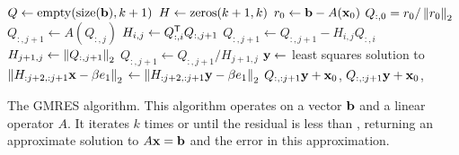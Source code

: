 \begin{algorithm}[H]
\begin{algorithmic}[1]
	\State $Q \gets \allocate{\size{\b}}{k+1}$			
	\State $H \gets \zeros{k+1}{ k}$
	\State $r_0 \gets \mathbf{b} - A(\mathbf{x}_0)$
	\State $Q_{:,0} = r_0/\left\lVert r_0\right\rVert_2$
    							
        \State $Q_{:,j+1} \gets A(Q_{:,j})$
            \State $H_{i,j} \gets Q_{:,i}^{\mathsf T} Q_{:,j+1}$
            \State $Q_{:,j+1} \gets Q_{:,j+1} - H_{i,j} Q_{:,i}$
        \EndFor
        \State $H_{j+1,j} \gets \left\lVert Q_{:,j+1}\right\rVert_2$
                                   
            \State $Q_{:,j+1} \gets Q_{:,j+1}/H_{j+1,j}$
        \EndIf
        \State $\mathbf{y} \gets$ least squares solution to $\left\lVert H_{:j+2,:j+1}\mathbf{x} - \beta e_1\right\rVert_2$     
        \State {} $\gets \left\lVert H_{:j+2,:j+1}\mathbf{y} - \beta e_1\right\rVert_2$
            \State {} $Q_{:,:j+1}\mathbf{y} + \mathbf{x}_0$, 
        \EndIf
    \EndFor
    \State {} $Q_{:,:j+1}\mathbf{y} + \mathbf{x}_0$, 
\EndProcedure
\end{algorithmic}
\caption{The GMRES algorithm. This algorithm operates on a vector $\mathbf{b}$ and a linear operator $A$.
It iterates $k$ times or until the residual is less than , returning an approximate solution to $A\mathbf{x}=\mathbf{b}$ and the error in this approximation.}
\label{alg:gmres}
\end{algorithm}

